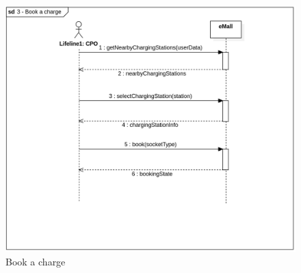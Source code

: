 \begin{figure}[H]
    \begin{center}
        \includegraphics[width=\textwidth]{img/sequence/book.png}
        \caption{Book a charge}
    \end{center}
\end{figure}
